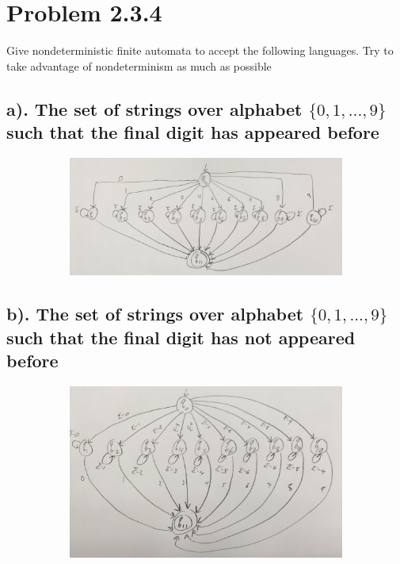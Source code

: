\documentclass[20pt]{article} %
\begin{document}
\newpage
\section{Problem 2.3.4} 
Give nondeterministic finite automata to accept the following languages. Try to take advantage of nondeterminism as much as possible
\subsection{a). The set of strings over alphabet $\{0,1,...,9\}$ such that the final digit has appeared before}
\begin{figure}[!htbp]
  	\centering
   	\begin{subfigure}[p]{0.9\linewidth}
    	\includegraphics[width=\linewidth]{./figures/h2-3.jpg}
   	\end{subfigure}
\end{figure}
\subsection{b). The set of strings over alphabet $\{0,1,...,9\}$ such that the final digit has not appeared before}
\begin{figure}[!htbp]
  	\centering
   	\begin{subfigure}[p]{0.9\linewidth}
    	\includegraphics[width=\linewidth]{./figures/h2-4.jpg}
   	\end{subfigure}
\end{figure}
\end{document}
